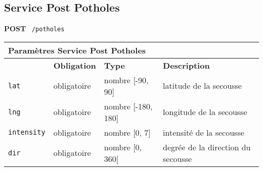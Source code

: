 \subsection{Service Post Potholes}
\label{appendix:sprint1-potholes-post-doc}

\textbf{POST} \ \texttt{/potholes}

\begin{table}[H]
    \centering
    \begin{tabularx}{\textwidth}{@{}p{2cm} p{2cm} p{3.5cm} p{6cm}@{}}
        \multicolumn{4}{X}{\textbf{Paramètres Service Post Potholes}} \\
        \toprule
        \rowcolor{gray!20}
        \multicolumn{1}{l}{\textbf{Élément}} &
        \multicolumn{1}{l}{\textbf{Obligation}} &
        \multicolumn{1}{l}{\textbf{Type}} &
        \multicolumn{1}{l}{\textbf{Description}} \\
        \midrule
        \verb|lat| & obligatoire & nombre [-90, 90] & latitude de la secousse \\
        \verb|lng| & obligatoire & nombre [-180, 180] & longitude de la secousse \\
        \verb|intensity| & obligatoire & nombre [0, 7] & intensité de la secousse \\
        \verb|dir| & obligatoire & nombre [0, 360[ & degrée de la direction du secousse \\
        \bottomrule
    \end{tabularx}
\end{table}
